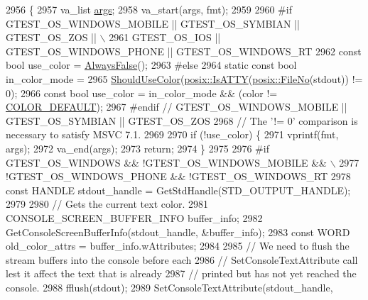 \begin{DoxyCode}
2956                                                            \{
2957   va\_list \hyperlink{namespacegenerate__debs_a75f9143e38df82d83b2e8a6f99cae02c}{args};
2958   va\_start(args, fmt);
2959 
2960 \textcolor{preprocessor}{#if GTEST\_OS\_WINDOWS\_MOBILE || GTEST\_OS\_SYMBIAN || GTEST\_OS\_ZOS || \(\backslash\)}
2961 \textcolor{preprocessor}{    GTEST\_OS\_IOS || GTEST\_OS\_WINDOWS\_PHONE || GTEST\_OS\_WINDOWS\_RT}
2962   \textcolor{keyword}{const} \textcolor{keywordtype}{bool} use\_color = \hyperlink{namespacetesting_1_1internal_a4b24c851ab13569b1b15b3d259b60d2e}{AlwaysFalse}();
2963 \textcolor{preprocessor}{#else}
2964   \textcolor{keyword}{static} \textcolor{keyword}{const} \textcolor{keywordtype}{bool} in\_color\_mode =
2965       \hyperlink{namespacetesting_1_1internal_ac1db1b4603967a6c4404f31cbbac31a6}{ShouldUseColor}(\hyperlink{namespacetesting_1_1internal_1_1posix_a16ebe936b3a8ea462a94191635aedc27}{posix::IsATTY}(\hyperlink{namespacetesting_1_1internal_1_1posix_a3117b067e1f942a2031e666953120ccc}{posix::FileNo}(stdout)) != 0);
2966   \textcolor{keyword}{const} \textcolor{keywordtype}{bool} use\_color = in\_color\_mode && (color != \hyperlink{namespacetesting_1_1internal_a648c1bc94c2ef9e868ff3f9dff0f9c4eafcd8803dc9e37e374d5a4486afc230b7}{COLOR\_DEFAULT});
2967 \textcolor{preprocessor}{#endif  // GTEST\_OS\_WINDOWS\_MOBILE || GTEST\_OS\_SYMBIAN || GTEST\_OS\_ZOS}
2968   \textcolor{comment}{// The '!= 0' comparison is necessary to satisfy MSVC 7.1.}
2969 
2970   \textcolor{keywordflow}{if} (!use\_color) \{
2971     vprintf(fmt, args);
2972     va\_end(args);
2973     \textcolor{keywordflow}{return};
2974   \}
2975 
2976 \textcolor{preprocessor}{#if GTEST\_OS\_WINDOWS && !GTEST\_OS\_WINDOWS\_MOBILE && \(\backslash\)}
2977 \textcolor{preprocessor}{    !GTEST\_OS\_WINDOWS\_PHONE && !GTEST\_OS\_WINDOWS\_RT}
2978   \textcolor{keyword}{const} HANDLE stdout\_handle = GetStdHandle(STD\_OUTPUT\_HANDLE);
2979 
2980   \textcolor{comment}{// Gets the current text color.}
2981   CONSOLE\_SCREEN\_BUFFER\_INFO buffer\_info;
2982   GetConsoleScreenBufferInfo(stdout\_handle, &buffer\_info);
2983   \textcolor{keyword}{const} WORD old\_color\_attrs = buffer\_info.wAttributes;
2984 
2985   \textcolor{comment}{// We need to flush the stream buffers into the console before each}
2986   \textcolor{comment}{// SetConsoleTextAttribute call lest it affect the text that is already}
2987   \textcolor{comment}{// printed but has not yet reached the console.}
2988   fflush(stdout);
2989   SetConsoleTextAttribute(stdout\_handle,

\end{DoxyCode}
